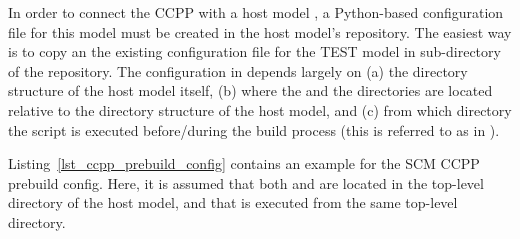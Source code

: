 In order to connect the CCPP with a host model , a Python-based configuration file for this model must be created in the host model's repository. The easiest way is to copy an the existing configuration file for the TEST model in sub-directory  of the  repository.
The configuration in  depends largely on (a) the directory structure of the host model itself, (b) where the  and the  directories are located relative to the directory structure of the host model, and (c) from which directory the  script is executed before/during the build process (this is referred to as  in ).

Listing~\ref{lst_ccpp_prebuild_config} contains an example for the SCM CCPP prebuild config. Here, it is assumed that both  and  are located in the top-level directory of the host model, and that  is executed from the same top-level directory.
